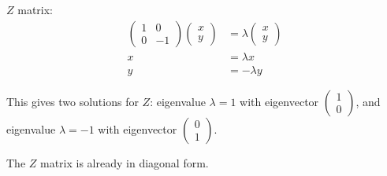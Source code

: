 \documentclass[12pt]{extarticle}
\begin{document}
$Z$ matrix:
\begin{align*}
\begin{pmatrix} 1 & 0 \\ 0 & -1 \end{pmatrix} \begin{pmatrix} x \\ y \end{pmatrix} & = \lambda \begin{pmatrix} x \\ y \end{pmatrix} \\
x & = \lambda x \\
y & = -\lambda y
\end{align*}

This gives two solutions for $Z$: eigenvalue $\lambda=1$ with eigenvector $\begin{pmatrix} 1 \\ 0 \end{pmatrix}$, and eigenvalue $\lambda=-1$ with eigenvector $\begin{pmatrix} 0 \\ 1 \end{pmatrix}$.

The $Z$ matrix is already in diagonal form.

\end{document}
